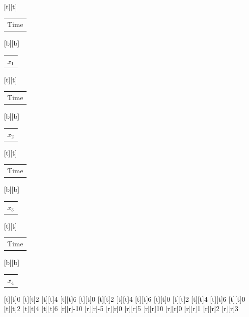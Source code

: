 %    
%
%
\begin{psfrags}%
\psfragscanon%
%
[t][t]{\setlength{\tabcolsep}{0pt}\begin{tabular}{c}Time\end{tabular}}%
[b][b]{\setlength{\tabcolsep}{0pt}\begin{tabular}{c}$x_1$\end{tabular}}%
[t][t]{\setlength{\tabcolsep}{0pt}\begin{tabular}{c}Time\end{tabular}}%
[b][b]{\setlength{\tabcolsep}{0pt}\begin{tabular}{c}$x_2$\end{tabular}}%
[t][t]{\setlength{\tabcolsep}{0pt}\begin{tabular}{c}Time\end{tabular}}%
[b][b]{\setlength{\tabcolsep}{0pt}\begin{tabular}{c}$x_3$\end{tabular}}%
[t][t]{\setlength{\tabcolsep}{0pt}\begin{tabular}{c}Time\end{tabular}}%
[b][b]{\setlength{\tabcolsep}{0pt}\begin{tabular}{c}$x_4$\end{tabular}}%
%
[t][t]{0}%
[t][t]{2}%
[t][t]{4}%
[t][t]{6}%
[t][t]{0}%
[t][t]{2}%
[t][t]{4}%
[t][t]{6}%
[t][t]{0}%
[t][t]{2}%
[t][t]{4}%
[t][t]{6}%
[t][t]{0}%
[t][t]{2}%
[t][t]{4}%
[t][t]{6}%
%
[r][r]{-10}%
[r][r]{-5}%
[r][r]{0}%
[r][r]{5}%
[r][r]{10}%
[r][r]{0}%
[r][r]{1}%
[r][r]{2}%
[r][r]{3}%

\end{psfrags}
